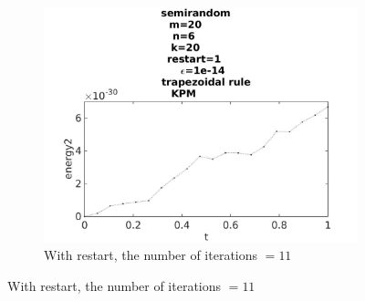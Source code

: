 \begin{figure}[H]
        ~
        \begin{subfigure}[b]{0.3\textwidth}
                \includegraphics[width=\textwidth]{../MATLAB/fig/energyarnrestart12.jpg}
                \caption{ With restart, the number of iterations $ = 11$ }
                \label{fig:energyarnrestart12}
        \end{subfigure}
        

\end{figure}
